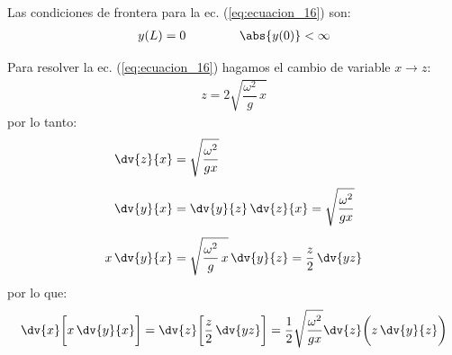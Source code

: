 Las condiciones de frontera para la ec. (\ref{eq:ecuacion_16}) son:
\begin{align}
y (L) = 0 \hspace{1.5cm} \abs{y (0)} < \infty
\label{eq:ecuacion_17}
\end{align}

Para resolver la ec. (\ref{eq:ecuacion_16}) hagamos el cambio de variable $x \to z$:
\begin{align}
z = 2 \sqrt{\dfrac{\omega^{2}}{g} \, x}
\label{eq:ecuacion_18}
\end{align}
por lo tanto:
\begin{align}
\begin{aligned}[b]
\dv{z}{x} &= \sqrt{\dfrac{\omega^{2}}{g x}} \\[0.5em]
\dv{y}{x} &= \dv{y}{z} \, \dv{z}{x} = \sqrt{\dfrac{\omega^{2}}{g x}} \\[0.5em]
x \, \dv{y}{x} &= \sqrt{\dfrac{\omega^{2}}{g} \, x} \, \dv{y}{z} = \dfrac{z}{2} \, \dv{y{z}}
\end{aligned}
\label{eq:ecuacion_19}
\end{align}
por lo que:
\begin{align}
\dv{x} \bigg[x \, \dv{y}{x} \bigg] = \dv{z} \bigg[ \dfrac{z}{2} \, \dv{y{z}} \bigg] = \dfrac{1}{2} \sqrt{\dfrac{\omega^{2}}{g x}} \dv{z} \bigg( z \, \dv{y}{z} \bigg)
\label{eq:ecuacion_20}
\end{align}

